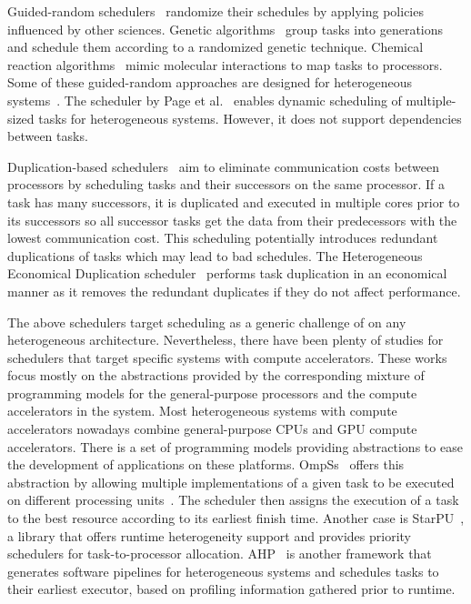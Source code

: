 Guided-random schedulers~\cite{Gen07, Chemical, Dyn05} randomize their schedules by applying policies influenced by other sciences. Genetic algorithms~\cite{Gen07} group tasks into generations and schedule them according to a randomized genetic technique. Chemical reaction algorithms~\cite{Chemical} mimic molecular interactions to map tasks to processors. Some of these guided-random approaches are designed for heterogeneous systems~\cite{Gen07, Chemical}. The scheduler by Page et al.~\cite{Dyn05} enables dynamic scheduling of multiple-sized tasks for heterogeneous systems. However, it does not support dependencies between tasks.

Duplication-based schedulers~\cite{Dup03, Dup11, Dup09} aim to eliminate communication costs between processors by scheduling tasks and their successors on the same processor. If a task has many successors, it is duplicated and executed in multiple cores prior to its successors so all successor tasks get the data from their predecessors with the lowest communication cost. This scheduling potentially introduces redundant duplications of tasks which may lead to bad schedules. The Heterogeneous Economical Duplication scheduler~\cite{Dup09} performs task duplication in an economical manner as it removes the redundant duplicates if they do not affect performance. 

The above schedulers target scheduling as a generic challenge of on any heterogeneous architecture. 
Nevertheless, there have been plenty of studies for schedulers that target specific systems with compute accelerators. 
These works focus mostly on the abstractions provided by the corresponding mixture of programming models for the general-purpose processors and the compute accelerators in the system.
Most heterogeneous systems with compute accelerators nowadays combine general-purpose CPUs and GPU compute accelerators. There is a set of programming models providing abstractions to ease the development of applications on these platforms. OmpSs~\cite{OmpSs_PPL11, OmpSs} offers this abstraction by allowing multiple implementations of a given task to be executed on different processing units~\cite{Judit}. The scheduler then assigns the execution of a task to the best resource according to its earliest finish time. Another case is StarPU~\cite{starpu}, a library that offers runtime heterogeneity support and provides priority schedulers for task-to-processor allocation. AHP~\cite{AHP} is another framework that generates software pipelines for heterogeneous systems and schedules tasks to their earliest executor, based on profiling information gathered prior to runtime.

